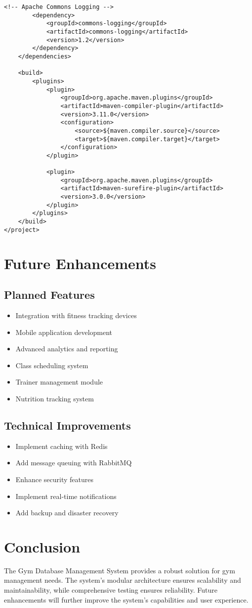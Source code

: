 \documentclass[12pt,a4paper]{report}
\begin{document}
\begin{lstlisting}[caption=pom.xml]
        <!-- Apache Commons Logging -->
        <dependency>
            <groupId>commons-logging</groupId>
            <artifactId>commons-logging</artifactId>
            <version>1.2</version>
        </dependency>
    </dependencies>

    <build>
        <plugins>
            <plugin>
                <groupId>org.apache.maven.plugins</groupId>
                <artifactId>maven-compiler-plugin</artifactId>
                <version>3.11.0</version>
                <configuration>
                    <source>${maven.compiler.source}</source>
                    <target>${maven.compiler.target}</target>
                </configuration>
            </plugin>
            
            <plugin>
                <groupId>org.apache.maven.plugins</groupId>
                <artifactId>maven-surefire-plugin</artifactId>
                <version>3.0.0</version>
            </plugin>
        </plugins>
    </build>
</project>
\end{lstlisting}

\chapter{Future Enhancements}
\section{Planned Features}
\begin{itemize}
    \item Integration with fitness tracking devices
    \item Mobile application development
    \item Advanced analytics and reporting
    \item Class scheduling system
    \item Trainer management module
    \item Nutrition tracking system
\end{itemize}

\section{Technical Improvements}
\begin{itemize}
    \item Implement caching with Redis
    \item Add message queuing with RabbitMQ
    \item Enhance security features
    \item Implement real-time notifications
    \item Add backup and disaster recovery
\end{itemize}

\chapter{Conclusion}
The Gym Database Management System provides a robust solution for gym management needs. The system's modular architecture ensures scalability and maintainability, while comprehensive testing ensures reliability. Future enhancements will further improve the system's capabilities and user experience.
\end{document}
